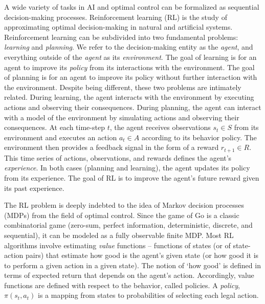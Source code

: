 A wide variety of tasks in AI and optimal control can be formalized as sequential decision-making processes. Reinforcement learning (RL) is the study of approximating optimal decision-making in natural and artificial systems. Reinforcement learning can be subdivided into two fundamental problems: \textit{learning} and \textit{planning}\cite{b1}. We refer to the decision-making entity as the \textit{agent}, and everything outside of the \textit{agent} as its \textit{environment}. The goal of learning is for an agent to improve its \textit{policy} from its interactions with the environment. The goal of planning is for an agent to improve its policy without further interaction with the environment. Despite being different, these two problems are intimately related. During learning, the agent interacts with the environment by executing actions and observing their consequences. During planning, the agent can interact with a model of the environment by simulating actions and observing their consequences. At each time-step $t$, the agent receives observations $s_t \in S$ from its environment and executes an action $a_t \in A$ according to its behavior policy. The environment then provides a feedback signal in the form of a reward $r_{t+1} \in R$. This time series of actions, observations, and rewards defines the agent's \textit{experience}. In both cases (planning and learning), the agent updates its policy from its experience. The goal of RL is to improve the agent's future reward given its past experience\cite{b2}. 

The RL problem is deeply indebted to the idea of Markov decision processes (MDPs) from the field of optimal control. Since the game of Go is a classic combinatorial game (zero-sum, perfect information, deterministic, discrete, and sequential\cite{b17,b18}), it can be modeled as a fully observable finite MDP\cite{b2}. Most RL algorithms involve estimating \textit{value} functions -- functions of states (or of state-action pairs) that estimate how good is the agent's given state (or how good it is to perform a given action in a given state). The notion of `how good' is defined in terms of expected return that depends on the agent's action. Accordingly, value functions are defined with respect to the behavior, called policies. A \textit{policy}, $\pi(s_t, a_t)$ is a mapping from states to probabilities of selecting each legal action\cite{b2}. 

